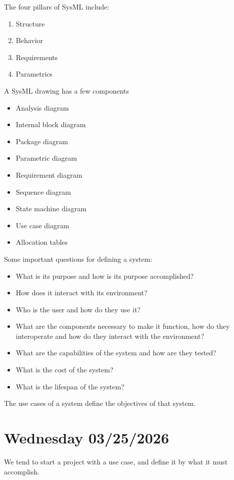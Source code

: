 \documentclass[11pt]{article}
\begin{document}
The four pillars of SysML include: 
\begin{enumerate}
    \item Structure
    \item Behavior
    \item Requirements
    \item Parametrics
\end{enumerate}

A SysML drawing has a few components
\begin{itemize}
    \item Analysis diagram
    \item Internal block diagram
    \item Package diagram
    \item Parametric diagram
    \item Requirement diagram
    \item Sequence diagram
    \item State machine diagram
    \item Use case diagram
    \item Allocation tables
\end{itemize}

Some important questions for defining a system:
\begin{itemize}
    \item What is its purpose and how is its purpose accomplished?
    \item How does it interact with its environment?
    \item Who is the user and how do they use it?
    \item What are the components necessary to make it function, how do they interoperate and how do they interact with the environment?
    \item What are the capabilities of the system and how are they tested?
    \item What is the cost of the system?
    \item What is the lifespan of the system?
\end{itemize}

The use cases of a system define the objectives of that system.

\section{Wednesday 03/25/2026}
We tend to start a project with a use case, and define it by what it must accomplish.
\end{document}
